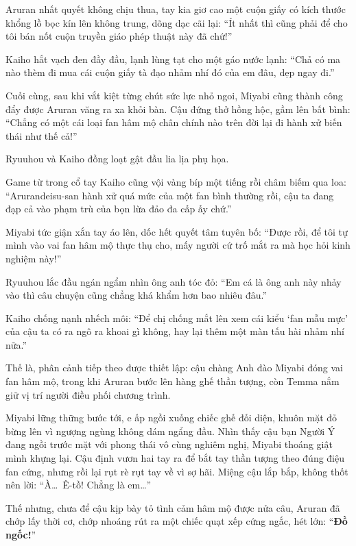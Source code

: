 \documentclass[../main.tex]{subfiles}
\begin{document}
Aruran nhất quyết không chịu thua, tay kia giơ cao một cuộn giấy có kích thước khổng lồ bọc kín lên không trung, dõng dạc cãi lại: ``Ít nhất thì cũng phải để cho tôi bán nốt cuộn truyền giáo phép thuật này đã chứ!''


Kaiho hắt vạch đen đầy đầu, lạnh lùng tạt cho một gáo nước lạnh: ``Chả có ma nào thèm đi mua cái cuộn giấy tà đạo nhảm nhí đó của em đâu, dẹp ngay đi.''

Cuối cùng, sau khi vắt kiệt từng chút sức lực nhỏ ngoi, Miyabi cũng thành công đẩy được Aruran văng ra xa khỏi bàn. Cậu đứng thở hồng hộc, gầm lên bất bình: ``Chẳng có một cái loại fan hâm mộ chân chính nào trên đời lại đi hành xử biến thái như thế cả!''

Ryuuhou và Kaiho đồng loạt gật đầu lia lịa phụ họa.

Game từ trong cổ tay Kaiho cũng vội vàng bíp một tiếng rồi châm biếm qua loa: ``Arurandeisu-san hành xử quá mức của một fan bình thường rồi, cậu ta đang đạp cả vào phạm trù của bọn lừa đảo đa cấp ấy chứ.''

Miyabi tức giận xắn tay áo lên, dốc hết quyết tâm tuyên bố: ``Được rồi, để tôi tự mình vào vai fan hâm mộ thực thụ cho, mấy người cứ trố mắt ra mà học hỏi kinh nghiệm này!''

Ryuuhou lắc đầu ngán ngẩm nhìn ông anh tóc đỏ: ``Em cá là ông anh này nhảy vào thì câu chuyện cũng chẳng khá khẩm hơn bao nhiêu đâu.''

Kaiho chống nạnh nhếch môi: ``Để chị chống mắt lên xem cái kiểu `fan mẫu mực' của cậu ta có ra ngô ra khoai gì không, hay lại thêm một màn tấu hài nhảm nhí nữa.''

\ct

Thế là, phân cảnh tiếp theo được thiết lập: cậu chàng Anh đào Miyabi đóng vai fan hâm mộ, trong khi Aruran bước lên hàng ghế thần tượng, còn Temma nắm giữ vị trí người điều phối chương trình.

Miyabi lững thững bước tới, e ấp ngồi xuống chiếc ghế đối diện, khuôn mặt đỏ bừng lên vì ngượng ngùng không dám ngẩng đầu. Nhìn thấy cậu bạn Người Ý đang ngồi trước mặt với phong thái vô cùng nghiêm nghị, Miyabi thoáng giật mình khựng lại. Cậu định vươn hai tay ra để bắt tay thần tượng theo đúng điệu fan cứng, nhưng rồi lại rụt rè rụt tay về vì sợ hãi. Miệng cậu lắp bắp, không thốt nên lời: ``À\dots\ Ê-tồ! Chẳng là em\dots''


Thế nhưng, chưa để cậu kịp bày tỏ tình cảm hâm mộ được nửa câu, Aruran đã chớp lấy thời cơ, chớp nhoáng rút ra một chiếc quạt xếp cứng ngắc, hét lớn: ``\textbf{Đồ ngốc!}''
\end{document}

